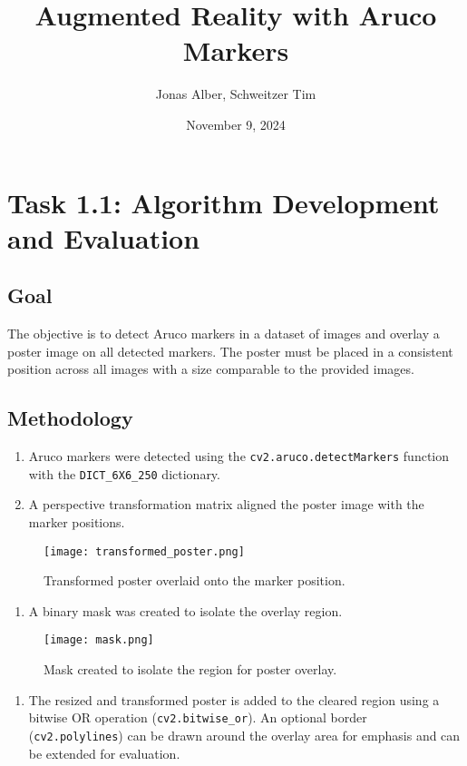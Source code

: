 \documentclass{article}
\title{Augmented Reality with Aruco Markers}
\author{Jonas Alber, Schweitzer Tim}
\date{November 9, 2024}
\begin{document}
\maketitle

\section*{Task 1.1: Algorithm Development and Evaluation}

\subsection*{Goal}
The objective is to detect Aruco markers in a dataset of images and overlay a poster image on all detected markers. The poster must be placed in a consistent position across all images with a size comparable to the provided images.

\subsection*{Methodology}
\begin{enumerate}
    \item Aruco markers were detected using the \texttt{cv2.aruco.detectMarkers} function with the \texttt{DICT\_6X6\_250} dictionary.
    \item A perspective transformation matrix aligned the poster image with the marker positions.
\end{enumerate}

\begin{figure}[H]  %
    \centering
    \texttt{[image: transformed\_poster.png]}  %
    \caption{Transformed poster overlaid onto the marker position.}
\end{figure}

\begin{enumerate}
    \item A binary mask was created to isolate the overlay region.
\end{enumerate}

\begin{figure}[H]  %
    \centering
    \texttt{[image: mask.png]}  %
    \caption{Mask created to isolate the region for poster overlay.}
\end{figure}

\begin{enumerate}[resume]
    \item The resized and transformed poster is added to the cleared region using a bitwise OR operation (\texttt{cv2.bitwise\_or}). An optional border (\texttt{cv2.polylines}) can be drawn around the overlay area for emphasis and can be extended for evaluation.
\end{enumerate}
\end{document}
